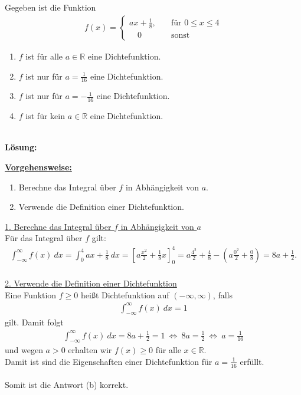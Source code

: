 \newpage

\subsection*{}
Gegeben ist die Funktion
\begin{align*}
f(x) 
=
\begin{cases}
ax + \frac{1}{8}, &\quad \textrm{für } 0 \leq x \leq 4\\
\quad 0					&\quad  \textrm{sonst}			
\end{cases}
\end{align*}
\renewcommand{\labelenumi}{(\alph{enumi})}
\begin{enumerate}
	\item $f $ ist für alle $ a \in \mathbb{R} $ eine Dichtefunktion.
	\item $f $ ist nur für $ a = \frac{1}{16} $ eine Dichtefunktion.
	\item
	$f $ ist nur für $ a = -\frac{1}{16} $ eine Dichtefunktion.
	\item
	$f $ ist für kein $ a \in \mathbb{R} $ eine Dichtefunktion.
\end{enumerate}
\ \\
\textbf{Lösung:}
\begin{mdframed}
	\underline{\textbf{Vorgehensweise:}}
	\renewcommand{\labelenumi}{\theenumi.}
	\begin{enumerate}
		\item Berechne das Integral über $ f $ in Abhängigkeit von $ a $.
		\item Verwende die Definition einer Dichtefunktion.
	\end{enumerate}
\end{mdframed}
\underline{1. Berechne das Integral über $ f $ in Abhängigkeit von $ a $}\\
Für das Integral über $ f $ gilt:
\begin{align*}
\int_{-\infty}^\infty f(x) \ dx
=
\int_0^4 ax + \frac{1}{8} \ dx
= 
\left[
a \frac{x^2}{2} + \frac{1}{8} x
\right]_0^4
=
a \frac{4^2}{2} + \frac{4}{8}- \left( a \frac{0^2}{2} + \frac{0}{8}\right)
=
8 a + \frac{1}{2}.
\end{align*}
\ \\
\underline{2. Verwende die Definition einer Dichtefunktion}\\
Eine Funktion $ f \geq 0 $ heißt Dichtefunktion auf $ (-\infty, \infty) $, falls
\begin{align*}
\int_{-\infty}^\infty f(x) \ dx = 1
\end{align*}
gilt.
Damit folgt
\begin{align*}
\int_{-\infty}^\infty f(x) \ dx
=
8a + \frac{1}{2} = 1 
\ \Leftrightarrow \
8a = \frac{1}{2}
\ \Leftrightarrow \
a =  \frac{1}{16}
\end{align*}
und wegen $ a > 0 $ erhalten wir $ f(x) \geq 0  $ für alle $ x \in \mathbb{R} $.\\
Damit ist sind die Eigenschaften einer Dichtefunktion für $ a = \frac{1}{16} $ erfüllt.\\
\\
Somit ist die Antwort (b) korrekt.
\newpage

